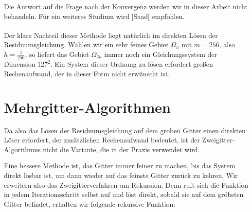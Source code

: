 Die Antwort auf die Frage nach der Konvergenz werden wir in dieser Arbeit nicht behandeln. Für ein weiteres Studium wird [Saad] empfohlen.\\ \\

Der klare Nachteil dieser Methode liegt natürlich im direkten Lösen der Residuumsgleichung. Wählen wir ein sehr feines Gebiet $\Omega_{h}$ mit $m = 256$, also $h = \frac {1} {256}$, so liefert das Gebiet $\Omega_{2h}$ immer noch ein Gleichungssystem der Dimension $127^{2}$. Ein System dieser Ordnung zu lösen erfordert großen Rechenaufwand, der in dieser Form nicht erwünscht ist. \\

\section{Mehrgitter-Algorithmen}\label{s.Mehrgitteralgorithmus}

Da also das Lösen der Residuumsgleichung auf dem groben Gitter einen direkten Löser erfordert, der zusätzlichen Rechenaufwand bedeutet, ist der Zweigitter-Algorithmus nicht die Variante, die in der Praxis verwendet wird.

Eine bessere Methode ist, das Gitter immer feiner zu machen, bis das System direkt lösbar ist, um dann wieder auf das feinste Gitter zurück zu kehren. Wir erweitern also das Zweigitterverfahren um Rekursion. Denn ruft sich die Funktion in jedem Iterationsschritt selbst auf und löst direkt, sobald sie auf dem gröbsten Gitter befindet, erhalten wir folgende rekursive Funktion:

